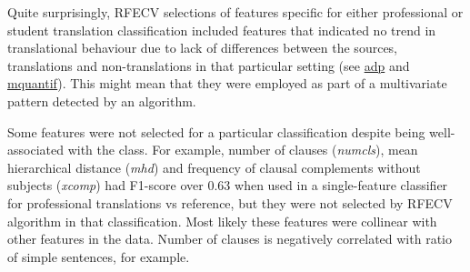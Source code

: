 Quite surprisingly, RFECV selections of features specific for either professional or student translation classification included features that indicated no trend in translational behaviour due to lack of differences between the sources, translations and non-translations in that particular setting (see \hyperlink{ft:adp}{adp} and \hyperlink{ft:mquantif}{mquantif}). This might mean that they were employed as part of a multivariate pattern detected by an algorithm.

Some features were not selected for a particular classification despite being well-associated with the class. For example, number of clauses (\textit{numcls}), mean hierarchical distance (\textit{mhd}) and frequency of clausal complements without subjects (\textit{xcomp}) had F1-score over 0.63 when used in a single-feature classifier for professional translations vs reference, but they were not selected by RFECV algorithm in that classification. Most likely these features were collinear with other features in the data. Number of clauses is negatively correlated with ratio of simple sentences, for example. 



